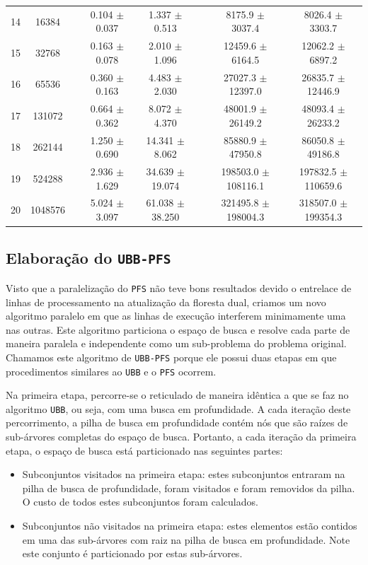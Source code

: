 \documentclass[12pt]{article}
\newcommand{\algname}[1]{\texttt{#1}}
\begin{document}
\begin{table}
\begin{tabular}{cc c cc c cc}
14 &   16384 && 0.104 $\pm$ 0.037 & 1.337 $\pm$ 0.513 && 8175.9 $\pm$ 3037.4 & 8026.4 $\pm$ 3303.7 \\
15 &   32768 && 0.163 $\pm$ 0.078 & 2.010 $\pm$ 1.096 && 12459.6 $\pm$ 6164.5 & 12062.2 $\pm$ 6897.2 \\
16 &   65536 && 0.360 $\pm$ 0.163 & 4.483 $\pm$ 2.030 && 27027.3 $\pm$ 12397.0 & 26835.7 $\pm$ 12446.9 \\
17 &  131072 && 0.664 $\pm$ 0.362 & 8.072 $\pm$ 4.370 && 48001.9 $\pm$ 26149.2 & 48093.4 $\pm$ 26233.2 \\
18 &  262144 && 1.250 $\pm$ 0.690 & 14.341 $\pm$ 8.062 && 85880.9 $\pm$ 47950.8 & 86050.8 $\pm$ 49186.8 \\
19 &  524288 && 2.936 $\pm$ 1.629 & 34.639 $\pm$ 19.074 && 198503.0 $\pm$ 108116.1 & 197832.5 $\pm$ 110659.6 \\
20 & 1048576 && 5.024 $\pm$ 3.097 & 61.038 $\pm$ 38.250 && 321495.8 $\pm$ 198004.3 & 318507.0 $\pm$ 199354.3 \\
\bottomrule
\end{tabular}
\end{table}


\subsection{Elaboração do \algname{UBB-PFS}}
Visto que a paralelização do \algname{PFS} não teve bons resultados 
devido o entrelace de linhas de processamento na atualização da floresta 
dual, criamos um novo algoritmo paralelo em que as linhas de execução
interferem minimamente uma nas outras. Este algoritmo particiona o 
espaço de busca e resolve cada parte de maneira paralela e independente
como um sub-problema do problema original. Chamamos este algoritmo de 
\algname{UBB-PFS} porque ele possui duas etapas em que procedimentos 
similares ao \algname{UBB} e o \algname{PFS} ocorrem. 

Na primeira etapa, percorre-se o reticulado de maneira idêntica a que 
se faz no algoritmo \algname{UBB}, ou seja, com uma busca em
profundidade. A cada iteração deste percorrimento, a pilha de busca em 
profundidade contém nós que são raízes de sub-árvores completas do
espaço de busca. Portanto, a cada iteração da primeira etapa, o espaço
de busca está particionado nas seguintes partes:
\begin{itemize}
    \item{Subconjuntos visitados na primeira etapa: estes subconjuntos
        entraram na pilha de busca de profundidade, foram visitados e 
        foram removidos da pilha. O custo de todos estes subconjuntos 
        foram calculados.}
    \item{Subconjuntos não visitados na primeira etapa: estes elementos
        estão contidos em uma das sub-árvores com raiz na pilha de
        busca em profundidade. Note este conjunto é particionado por
        estas sub-árvores.}
\end{itemize}
\end{document}
